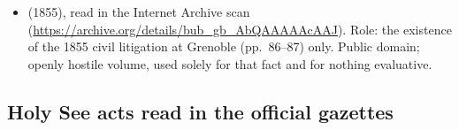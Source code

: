 \begin{itemize}
{séminaire de Grenoble} (Grenoble, 1866), read in the Internet
Archive scan
(\url{https://archive.org/details/viedemrousselot00abbgoog}). Role:
the inventory of Roman grants of 1852 with their dates
(pp.~138--139); Ginoulhiac's acts of 1854 and the circular of 1857
(pp.~145--146); the operative French clause of the judgment inside
the biographer's own sentence (p.~415). Public domain; partisan
diocesan biography, used at that ceiling.
\item {} (1855), read in the Internet
Archive scan
(\url{https://archive.org/details/bub_gb_AbQAAAAAcAAJ}). Role: the
existence of the 1855 civil litigation at Grenoble (pp.~86--87)
only. Public domain; openly hostile volume, used solely for that
fact and for nothing evaluative.
\end{itemize}

\subsection*{Holy See acts read in the official gazettes}

